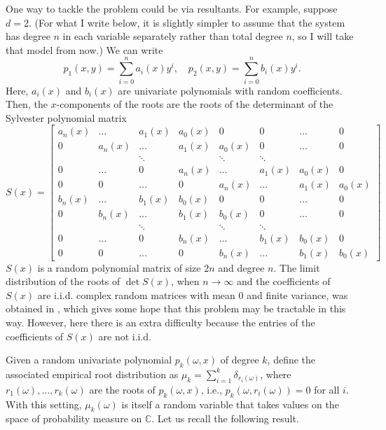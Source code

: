 \documentclass[12pt]{article}
\def\C{\mathbb{C}}
\begin{document}
One way to tackle the problem could be via resultants. For example, suppose $d=2$. (For what I write below, it is slightly simpler to assume that the system has degree $n$ in each variable separately rather than total degree $n$, so I will take that model from now.) We can write
\[  p_1(x,y) = \sum_{i=0}^n a_i(x) y^i, \quad p_2(x,y)=\sum_{i=0}^n b_i(x) y^i.  \]
Here, $a_i(x)$ and $b_i(x)$ are univariate polynomials with random coefficients. Then, the $x$-components of the roots are the roots of the determinant of the Sylvester polynomial matrix
\[  S(x) = \begin{bmatrix}
a_n(x) & \dots & a_1(x) & a_0(x) & 0 & 0 & \dots & 0\\
0& a_n(x) & \dots & a_1(x) & a_0(x) & 0 & \dots & 0\\
&&\ddots&&\ddots&\ddots&&\\
0&\dots&0&a_n(x)&\dots&a_1(x)&a_0(x)&0\\
0&0&\dots&0&a_n(x)&\dots&a_1(x)&a_0(x)\\
b_n(x) & \dots & b_1(x) & b_0(x) & 0 & 0 & \dots & 0\\
0& b_n(x) & \dots & b_1(x) & b_0(x) & 0 & \dots & 0\\
&&\ddots&&\ddots&\ddots&&\\
0&\dots&0&b_n(x)&\dots&b_1(x)&b_0(x)&0\\
0&0&\dots&0&b_n(x)&\dots&b_1(x)&b_0(x)
\end{bmatrix}
     \]
$S(x)$ is a random polynomial matrix of size $2n$ and degree $n$. The limit distribution of the roots of $\det S(x)$, when $n \rightarrow \infty$ and the coefficients of $S(x)$ are i.i.d. complex random matrices with mean $0$ and finite variance, was obtained in \cite[Theorem 1.2]{BN}, which gives some hope that this problem may be tractable in this way. However, here there is an extra difficulty because the entries of the coefficients of $S(x)$ are not i.i.d.
\newpage

Given a random univariate polynomial $p_k(\omega,x)$ of degree $k$, define the associated empirical root distribution as $\mu_k = \sum_{i=1}^k \delta_{r_i(\omega)}$, where $r_1(\omega),\dots,r_k(\omega)$ are the roots of $p_k(\omega,x)$, i.e., $p_k(\omega,r_i(\omega))=0$ for all $i$. With this setting, $\mu_k(\omega)$ is itself a random variable that takes values on the space of probability measure on $\C$. Let us recall the following result.
\end{document}
